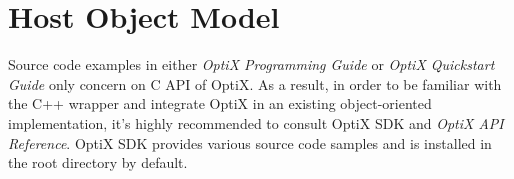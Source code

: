 
\section{Host Object Model}
\label{host}
Source code examples in either \textit{OptiX Programming Guide} or \textit{OptiX Quickstart Guide} only concern on C API of OptiX. As a result, in order to be familiar with the C++ wrapper and integrate OptiX in an existing object-oriented implementation, it's highly recommended to consult OptiX SDK and \textit{OptiX API Reference}. OptiX SDK provides various source code samples and is installed in the root directory by default.


